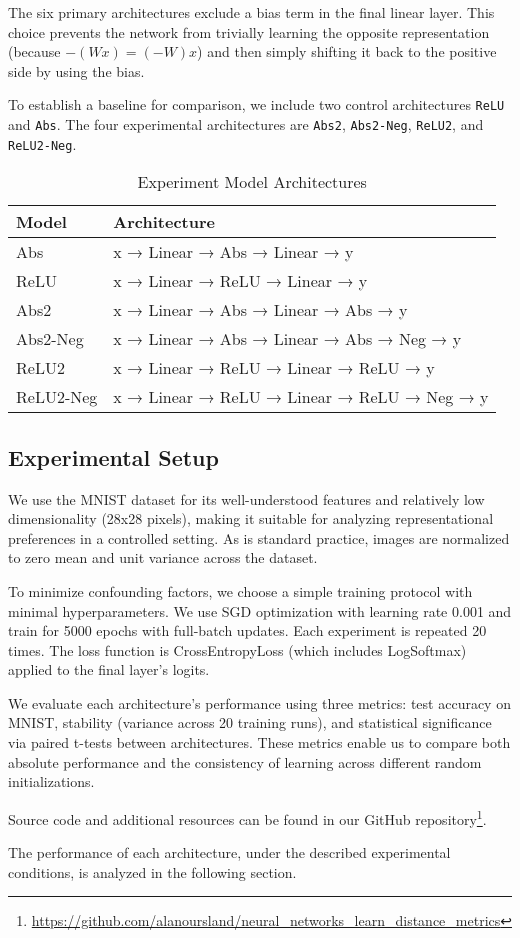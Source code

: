 The six primary architectures exclude a bias term in the final linear layer. This choice prevents the network from trivially learning the opposite representation (because $-(Wx)=(-W)x$) and then simply shifting it back to the positive side by using the bias. 

To establish a baseline for comparison, we include two control architectures \texttt{ReLU} and \texttt{Abs}. The four experimental architectures are \texttt{Abs2}, \texttt{Abs2-Neg}, \texttt{ReLU2}, and \texttt{ReLU2-Neg}. 

\begin{table}[H]
    \centering
    \begin{tabular}{ll}
        \toprule
        \textbf{Model} & \textbf{Architecture}\\
        \midrule
        Abs & x → Linear → Abs → Linear → y \\
        ReLU & x → Linear → ReLU → Linear → y \\
        \midrule
        Abs2 & x → Linear → Abs → Linear → Abs → y \\
        Abs2-Neg & x → Linear → Abs → Linear → Abs → Neg → y \\
        ReLU2 & x → Linear → ReLU → Linear → ReLU → y \\
        ReLU2-Neg & x → Linear → ReLU → Linear → ReLU → Neg → y \\
        \bottomrule
    \end{tabular}
    \caption{Experiment Model Architectures}
\end{table}

\subsection{Experimental Setup}
We use the MNIST dataset \cite{lecun1998gradient} for its well-understood features and relatively low dimensionality (28x28 pixels), making it suitable for analyzing representational preferences in a controlled setting. As is standard practice, images are normalized to zero mean and unit variance across the dataset.

To minimize confounding factors, we choose a simple training protocol with minimal hyperparameters. We use SGD optimization with learning rate 0.001 and train for 5000 epochs with full-batch updates. Each experiment is repeated 20 times. The loss function is CrossEntropyLoss (which includes LogSoftmax) applied to the final layer's logits.

We evaluate each architecture's performance using three metrics: test accuracy on MNIST, stability (variance across 20 training runs), and statistical significance via paired t-tests between architectures. These metrics enable us to compare both absolute performance and the consistency of learning across different random initializations.

Source code and additional resources can be found in our GitHub repository\footnote{\url{https://github.com/alanoursland/neural_networks_learn_distance_metrics}}.

The performance of each architecture, under the described experimental conditions, is analyzed in the following section. 

